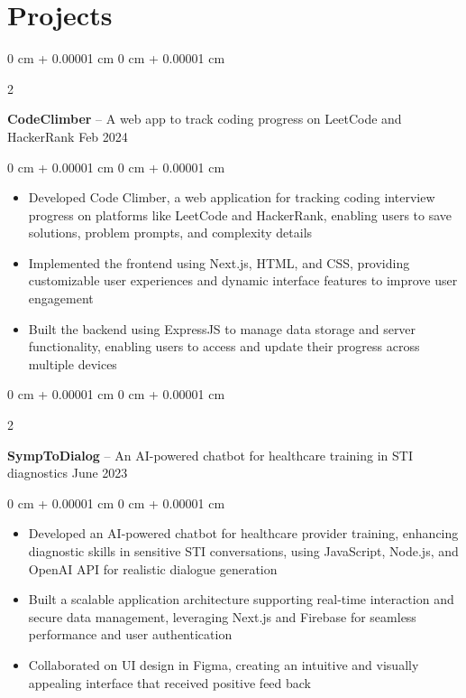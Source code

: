 \documentclass[10pt, letterpaper]{article}
\newenvironment{highlights}{
    \begin{itemize}[
        topsep=0.10 cm,
        parsep=0.10 cm,
        partopsep=0pt,
        itemsep=0pt,
        leftmargin=0 cm + 10pt
    ]
}{
    \end{itemize}
} %
\newenvironment{onecolentry}{
    \begin{adjustwidth}{
        0 cm + 0.00001 cm
    }{
        0 cm + 0.00001 cm
    }
}{
    \end{adjustwidth}
} %
\newenvironment{twocolentry}[2][]{
    \onecolentry
    \def\secondColumn{#2}
    \setcolumnwidth{\fill, 4.5 cm}
    \begin{paracol}{2}
}{
    \switchcolumn \raggedleft \secondColumn
    \end{paracol}
    \endonecolentry
} %
\begin{document}
    
    \section{Projects}



        
        \begin{twocolentry}{
            Feb 2024
        }
            \textbf{CodeClimber} -- A web app to track coding progress on LeetCode and HackerRank\end{twocolentry}

        \vspace{0.10 cm}
        \begin{onecolentry}
            \begin{highlights}
                \item Developed Code Climber, a web application for tracking coding interview progress on platforms like LeetCode and HackerRank, enabling users to save solutions, problem prompts, and complexity details
                \item Implemented the frontend using Next.js, HTML, and CSS, providing customizable user experiences and dynamic interface features to improve user engagement
                \item Built the backend using ExpressJS to manage data storage and server functionality, enabling users to access and update their progress across multiple devices
            \end{highlights}
        \end{onecolentry}


        \vspace{0.2 cm}

        \begin{twocolentry}{
            June 2023
        }
            \textbf{SympToDialog} -- An AI-powered chatbot for healthcare training in STI diagnostics\end{twocolentry}

        \vspace{0.10 cm}
        \begin{onecolentry}
            \begin{highlights}
                \item Developed an AI-powered chatbot for healthcare provider training, enhancing diagnostic skills in sensitive STI conversations, using JavaScript, Node.js, and OpenAI API for realistic dialogue generation
                \item Built a scalable application architecture supporting real-time interaction and secure data management, leveraging Next.js and Firebase for seamless performance and user authentication
                \item Collaborated on UI design in Figma, creating an intuitive and visually appealing interface that received positive feed back
            \end{highlights}
        \end{onecolentry}
\end{document}
